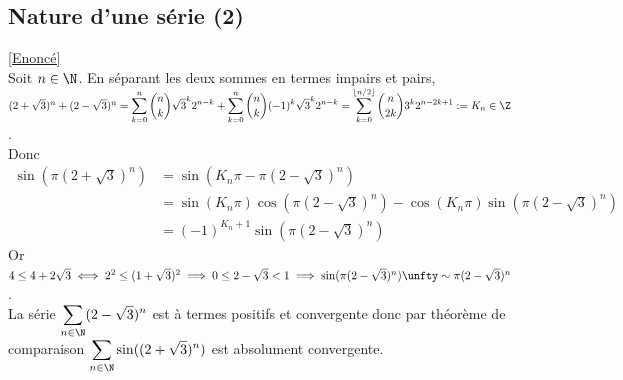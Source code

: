 \documentclass{book}
\begin{document}
	\subsection{Nature d'une série (2) }
	\label{Nature d'une série (2) corrigé}
	\textcolor{blue}{\hyperref[Nature d'une série (2)]{[Enoncé]}}\\
	Soit $n\in \N$. En séparant les deux sommes en termes impairs et pairs,\\
	$(2+\sqrt 3)^n+(2-\sqrt 3)^n=\displaystyle\sum_{k=0}^n\binom{n}{k}\sqrt{3}^k2^{n-k}+\sum_{k=0}^n\binom{n}{k}(-1)^k\sqrt{3}^k2^{n-k}=\sum_{k=0}^{\lfloor n/2\rfloor}\binom{n}{2k}3^k2^{n-2k+1}:=K_n\in \Z$.\\
	Donc \begin{align*}
		\sin(\pi(2+\sqrt 3)^n)&=\sin(K_n\pi-\pi(2-\sqrt 3)^n)\\
		&=\sin(K_n\pi)\cos(\pi(2-\sqrt 3)^n)-\cos(K_n\pi)\sin(\pi(2-\sqrt 3)^n)\\
		&=(-1)^{K_n+1}\sin(\pi(2-\sqrt 3)^n)
	\end{align*}
	Or $4\leq 4+2\sqrt 3\iff 2^2\leq (1+\sqrt 3)^2\implies 0\leq 2-\sqrt 3<1\implies \sin(\pi(2-\sqrt 3)^n)\unfty\sim\pi(2-\sqrt 3)^n$.\\
	La série $\displaystyle\sum_{n\in \N}(2-\sqrt 3)^n$ est à termes positifs et convergente donc par théorème de comparaison $\displaystyle\sum_{n\in \N}\sin((2+\sqrt 3)^n)$ est absolument convergente.
	
\end{document}
